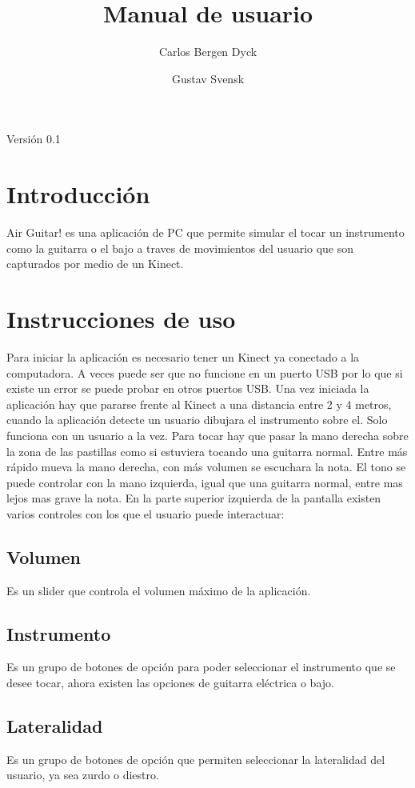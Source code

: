 \documentclass[a4paper,10pt]{article}
\title{Manual de usuario}
\author{Carlos Bergen Dyck \and Gustav Svensk}
\begin{document}
\renewcommand{\arraystretch}{1.5}
\maketitle
\begin{center}
        {\large Versión 0.1}
\end{center}
\newpage

\section{Introducción}
Air Guitar! es una aplicación de PC que permite simular el tocar un instrumento como la guitarra o el bajo a traves de movimientos del usuario que son capturados por medio de un Kinect.


\section{Instrucciones de uso}
Para iniciar la aplicación es necesario tener un Kinect ya conectado a la computadora. A veces puede ser que no funcione en un puerto USB por lo que si existe un error se puede probar en otros puertos USB. Una vez iniciada la aplicación hay que pararse frente al Kinect a una distancia entre 2 y 4 metros, cuando la aplicación detecte un usuario dibujara el instrumento sobre el. Solo funciona con un usuario a la vez.
Para tocar hay que pasar la mano derecha sobre la zona de las pastillas como si estuviera tocando una guitarra normal. Entre más rápido mueva la mano derecha, con más volumen se escuchara la nota. El tono se puede controlar con la mano izquierda, igual que una guitarra normal, entre mas lejos mas grave la nota.
En la parte superior izquierda de la pantalla existen varios controles con los que el usuario puede interactuar:
\subsection{Volumen}
Es un slider que controla el volumen máximo de la aplicación.
\subsection{Instrumento}
Es un grupo de botones de opción para poder seleccionar el instrumento que se desee tocar, ahora existen las opciones de guitarra eléctrica o bajo.
\subsection{Lateralidad}
Es un grupo de botones de opción que permiten seleccionar la lateralidad del usuario, ya sea zurdo o diestro.
\end{document}
